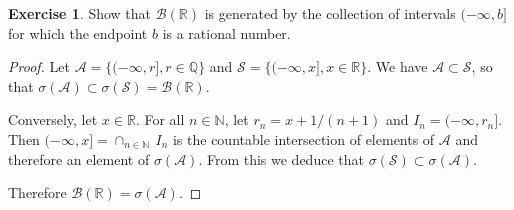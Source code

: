 \documentclass[11pt,a4paper,twoside]{article}
\theoremstyle{definition}
\newcounter{excounter}
\newtheorem{exercise}[excounter]{Exercise}
\begin{document}
\begin{exercise}

  Show that $\mathscr{B} ( \mathbb{R} )$ is generated by the collection of intervals $ ( {-\infty}, b ]$
    for which the endpoint $b$ is a rational number.

\end{exercise}

\begin{proof}

  Let $\mathscr{A} = \{ ( {-\infty}, r ], r \in \mathbb{Q} \}$ and $\mathscr{S} = \{ ( {-\infty}, x ], x \in \mathbb{R} \}$.
  We have $\mathscr{A} \subset \mathscr{S}$, so that $\sigma ( \mathscr{A} ) \subset \sigma ( \mathscr{S} ) = \mathscr{B} ( \mathbb{R} )$.

  Conversely, let $x \in \mathbb{R}$. For all $n \in \mathbb{N}$, let $r_n = x + 1 / ( n + 1 )$ and $I_n = ( {-\infty}, r_n ]$.
  Then $( {-\infty}, x ] = \cap_{n \in \mathbb{N}} \,I_n$ is the countable intersection of elements of $\mathscr{A}$ and therefore
  an element of $\sigma ( \mathscr{A} )$. From this we deduce that $\sigma ( \mathscr{S} ) \subset \sigma ( \mathscr{A} )$.

  Therefore $\mathscr{B} ( \mathbb{R} ) = \sigma ( \mathscr{A} )$.

\end{proof}
\end{document}

